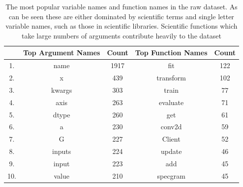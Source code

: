\begin{table}[h!]
    \begin{center}
    \begin{tabular}{c | c | c | c | c}
        & Top Argument Names & Count  &   Top Function Names & Count \\  
        \hline               
        1.   &  name     &     1917    &   fit       &    122 \\        
        2.   &  x        &     439     &   transform &    102 \\         
        3.   &  kwargs   &     303     &   train     &    77 \\         
        4.   &  axis     &     263     &   evaluate  &    71 \\        
        5.   &  dtype    &     260     &   get       &    61 \\         
        6.   &  a        &     230     &   conv2d    &    59 \\        
        7.   &  G        &     227     &   Client    &    52 \\        
        8.   &  inputs   &     224     &   update    &    46 \\        
        9.   &  input    &     223     &   add       &    45 \\         
        10.  &  value    &     210     &   specgram  &    45 \\         
    
    \end{tabular}
    \caption {The most popular variable names and function names in the raw dataset. As can be seen these are either dominated by scientific terms and single letter variable names, such as those in scientific libraries. Scientific functions which take large numbers of arguments contribute heavily to the dataset}
    \label{table:popular_variable_names}
    \end{center}
\end{table}

